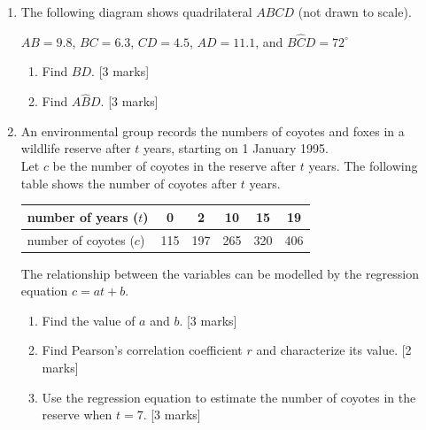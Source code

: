 \documentclass[12pt, twoside]{article}
\begin{document}
\begin{enumerate}
    
\newpage
  \item The following diagram shows quadrilateral $ABCD$ (not drawn to scale).
  \begin{center}
    \end{center} 
    $AB=9.8$, $BC=6.3$, $CD=4.5$, $AD=11.1$, and $B\hat{C}D=72^\circ$
    \begin{enumerate}
      \item Find $BD$. \hfill [3 marks] \vspace{6cm}
      \item Find $A\hat{B}D$. \hfill [3 marks]
    \end{enumerate}

\newpage
    \item An environmental group records the numbers of coyotes and foxes in a wildlife reserve after $t$ years, starting on 1 January 1995.\\[0.25cm]
    Let $c$ be the number of coyotes in the reserve after $t$ years. The following table shows the number of coyotes after $t$ years.
      \begin{center}
        \begin{tabular}{|l|c|c|c|c|c|}
          \hline
          number of years ($t$) & 0 & 2 & 10 & 15 & 19 \\ 
          \hline 
          number of coyotes ($c$) & 115 & 197 & 265 & 320 & 406  \\ 
          \hline 
          \end{tabular}
        \end{center}
      The relationship between the variables can be modelled by the regression equation $c=at+b$.
      \begin{enumerate}
        \item Find the value of $a$ and $b$. \hfill [3 marks] \vspace{3cm}
        \item Find Pearson's correlation coefficient $r$ and characterize its value. \hfill [2 marks] \vspace{3cm}
        \item Use the regression equation to estimate the number of coyotes in the reserve when $t=7$. \hfill [3 marks]
      \end{enumerate}


\end{enumerate}
\end{document}
